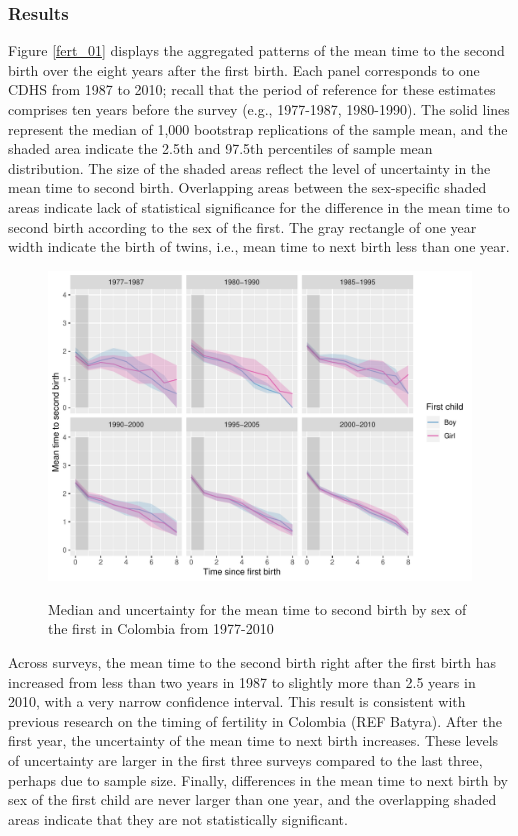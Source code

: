 \documentclass{article}
\begin{document}
\subsubsection{Results}
Figure \ref{fert_01} displays the aggregated patterns of the mean time to the second birth over the eight years after the first birth. Each panel corresponds to one CDHS from 1987 to 2010; recall that the period of reference for these estimates comprises ten years before the survey (e.g., 1977-1987, 1980-1990). The solid lines represent the median of 1,000 bootstrap replications of the sample mean, and the shaded area indicate the 2.5th and 97.5th percentiles of sample mean distribution. The size of the shaded areas reflect the level of uncertainty in the mean time to second birth. Overlapping areas between the sex-specific shaded areas indicate lack of statistical significance for the difference in the mean time to second birth according to the sex of the first. The gray rectangle of one year width indicate the birth of twins, i.e., mean time to next birth less than one year.
\begin{figure}[H]
\centering
    \includegraphics[width=\textwidth]{Spells/Figures/colombia/colombia_period_boost_1.pdf}\\
    \caption{Median and uncertainty for the mean time to second birth by sex of the first in Colombia from 1977-2010}
 \end{figure}

Across surveys, the mean time to the second birth right after the first birth has increased from less than two years in 1987 to slightly more than 2.5 years in 2010, with a very narrow confidence interval. This result is consistent with previous research on the timing of fertility in Colombia (REF Batyra). After the first year, the uncertainty of the mean time to next birth increases. These levels of uncertainty are larger in the first three surveys compared to the last three, perhaps due to sample size. Finally, differences in the mean time to next birth by sex of the first child are never larger than one year, and the overlapping shaded areas indicate that they are not statistically significant.
\end{document}
